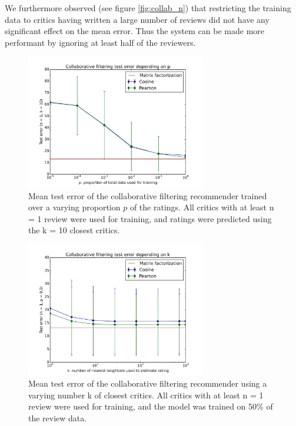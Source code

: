 \documentclass[12pt]{article}
\begin{document}
We furthermore observed (see figure \ref{fig:collab_n}) that restricting the
training data to critics having
written a large number of reviews did not have any significant effect on the
mean error. Thus the system can be made more performant by ignoring at least
half of the reviewers.

\begin{figure}[H]
\centering
\includegraphics[width=0.7\textwidth]{../plots/collab/graph_p.png}
\caption{Mean test error of the collaborative filtering recommender trained
    over a varying proportion $p$ of the ratings. All critics with at least
    n = 1 review were used for training, and ratings were predicted using the
    k = 10 closest critics.}
\label{fig:collab_p}
\end{figure}

\begin{figure}[H]
\centering
\includegraphics[width=0.7\textwidth]{../plots/collab/graph_k.png}
\caption{Mean test error of the collaborative filtering recommender using a
    varying number k of closest critics. All critics with at least n = 1
    review were used for training, and the model was trained on 50\% of the
    review data.}
\label{fig:collab_k}
\end{figure}
\end{document}
